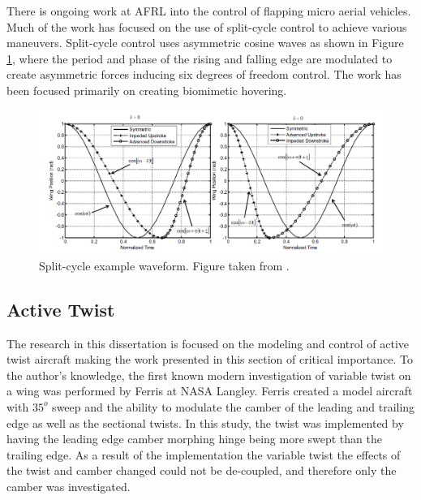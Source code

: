 \documentclass[11pt]{ucthesis}
\begin{document}
There is ongoing work at AFRL into the control of flapping micro aerial vehicles. Much of the work has focused on the use of split-cycle control to achieve various maneuvers. \cite{weintraub2014implementation} Split-cycle control uses asymmetric cosine waves as shown in Figure \ref{fig:splitCycle}, where the period and phase of the rising and falling edge are modulated to create asymmetric forces inducing six degrees of freedom control. The work has been focused primarily on creating biomimetic hovering. \cite{doman2010wingbeat,oppenheimer2011dynamics}

\begin{figure}[thpb]
\centering
\includegraphics[width=1\linewidth]{./Figures/splitCycle.png}
\caption{Split-cycle example waveform. Figure taken from  \cite{weintraub2014implementation}.}
\label{fig:splitCycle}
\end{figure}

\subsection{Active Twist}

The research in this dissertation is focused on the modeling and control of active twist aircraft making the work presented in this section of critical importance. To the author's knowledge, the first known modern investigation of variable twist on a wing was performed by Ferris at NASA Langley. \cite{ferris1977wind} Ferris created a model aircraft with $35^{o}$ sweep and the ability to modulate the camber of the leading and trailing edge as well as the sectional twists. In this study, the twist was implemented by having the leading edge camber morphing hinge being more swept than the trailing edge. As a result of the implementation the variable twist the effects of the twist and camber changed could not be de-coupled, and therefore only the camber was investigated.
\end{document}
